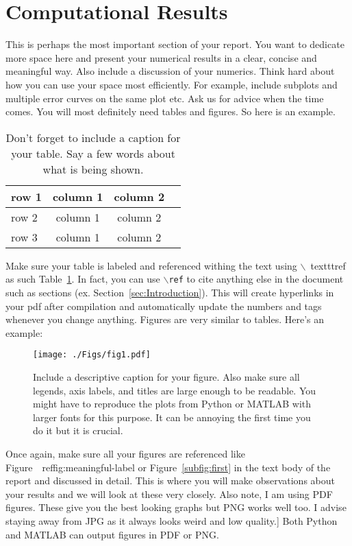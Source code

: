 \documentclass[11pt]{amsart}
\begin{document}
\section{Computational Results}\label{sec:results}
This is perhaps the most important section of your report. You want to dedicate
more space
here and present your numerical results in a clear, concise and meaningful way.
Also
include a discussion of your numerics. Think hard about how you can use
your space most efficiently. For example, include subplots and multiple error
curves on the
same plot etc. Ask us for advice when the time comes.
You will most definitely need tables and figures. So here is an example.
\begin{table}[htp]
\centering
\begin{tabular}{| l | c|c | r |}
\hline
row 1 & column 1 & column 2 \\ \hline
row 2 & column 1 & column 2 \\
row 3 & column 1 & column 2 \\ \hline
\end{tabular}
\caption{Don't forget to include a caption for your table. Say a few words
about what is
being shown.}
\label{tab:meaningful-label}
\end{table}
Make sure your table is labeled and referenced withing the text using $\backslash$\
texttt{ref} as such Table~\ref{tab:meaningful-label}. In fact, you can
use $\backslash$\texttt{ref} to cite anything else in the document such as
sections (ex. Section~\ref{sec:Introduction}). This will create hyperlinks in your
pdf after compilation and automatically update the numbers and tags whenever you
change
anything.
Figures are very similar to tables. Here's an example:
\begin{figure}[htp]
\centering
\texttt{[image: ./Figs/fig1.pdf]}
\caption{Include a descriptive caption for your figure. Also make sure all
legends, axis labels, and titles are large enough to be readable. You might
have
to reproduce the plots from Python or MATLAB with larger fonts for this
purpose. It
can be annoying the first time you do it but it is crucial.}
\label{fig:meaningful-label}
\end{figure}

Once again, make sure all your figures are referenced like Figure~\
ref{fig:meaningful-label}
or Figure~\ref{subfig:first} in the text body of the report and discussed
in detail. This is where you will make observations about your results and we will
look at these very closely.
Also note, I am using PDF figures. These give you the best looking graphs but PNG
works
well too. I advise staying away from JPG as it always looks weird and low quality.]
Both Python and MATLAB can output figures in PDF or PNG.
\end{document}
